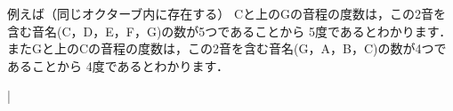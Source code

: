 \documentclass[dvipdfmx,uplatex,b5paper,openany,jbase=12Q,nomag*,textwidth-limit=44%
               ]{gachimuchi}[2020/05/05]
\begin{document}
\begin{Music}
  \nostartrule%
  \Startpiece%
  \Notes%
  \Mryaku\sk%
  \en\doublebar
  \Notes{}%
  \en\setdoublebar
  \endpiece%
\end{Music}

例えば（同じオクターブ内に存在する） Cと上のGの音程の度数は，この2音を含む音名(C，D，E，F，G)の数が5つであることから
5度であるとわかります．
またGと上のCの音程の度数は，この2音を含む音名(G，A，B，C)の数が4つであることから
4度であるとわかります．
\begin{Music}[.5\linewidth]
  \nostartrule%
  \Startpiece%
  \notes{}\multnoteskip{\tinyvalue}%
  \tinynotesize
  \en\Notes
  \en\bar%
  \Notes{}\multnoteskip{\tinyvalue}%
  \tinynotesize
  \en\Notes
  \en
  \endpiece%
\end{Music}
\end{document}
